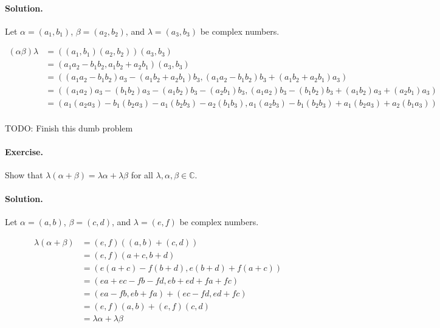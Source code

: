 \documentclass[12pt]{article}
\newenvironment{exercise}{\paragraph{Exercise.}}{}
\newenvironment{solution}{\paragraph{Solution.}}{}
\newcommand{\C}{\mathbb{C}}
\begin{document}
\begin{solution}
  Let $\alpha = (a_1, b_1)$, $\beta = (a_2, b_2)$, and $\lambda = (a_3, b_3)$
  be complex numbers.

  \[
    \begin{split}
      (\alpha\beta)\lambda
        & = ((a_1, b_1)(a_2, b_2))(a_3, b_3)                                                                               \\
        & = (a_1a_2 - b_1b_2, a_1b_2 + a_2b_1)(a_3, b_3)                                                                   \\
        & = ((a_1a_2 - b_1b_2)a_3 - (a_1b_2 + a_2b_1)b_3, (a_1a_2 - b_1b_2)b_3 + (a_1b_2 + a_2b_1)a_3)                     \\
        & = ((a_1a_2)a_3 - (b_1b_2)a_3 - (a_1b_2)b_3 - (a_2b_1)b_3, (a_1a_2)b_3 - (b_1b_2)b_3 + (a_1b_2)a_3 + (a_2b_1)a_3) \\
        & = (a_1(a_2a_3) - b_1(b_2a_3) - a_1(b_2b_3) - a_2(b_1b_3), a_1(a_2b_3) - b_1(b_2b_3) + a_1(b_2a_3) + a_2(b_1a_3)) \\
    \end{split}
  \]

  TODO: Finish this dumb problem
\end{solution}

\begin{exercise}
  Show that $\lambda(\alpha + \beta) = \lambda\alpha + \lambda\beta$ for all
  $\lambda, \alpha, \beta \in \C$.
\end{exercise}

\begin{solution}
  Let $\alpha = (a, b)$, $\beta = (c, d)$, and $\lambda = (e, f)$ be complex
  numbers.

  \[
    \begin{split}
      \lambda(\alpha + \beta) & = (e, f)((a, b) + (c, d))                    \\
                              & = (e, f)(a + c, b + d)                       \\
                              & = (e(a + c) - f(b + d), e(b + d) + f(a + c)) \\
                              & = (ea + ec - fb - fd, eb + ed + fa + fc)     \\
                              & = (ea - fb, eb + fa) + (ec - fd, ed + fc)    \\
                              & = (e, f)(a, b) + (e, f)(c, d)                \\
                              & = \lambda\alpha + \lambda\beta               \\
    \end{split}
  \]
\end{solution}
\end{document}

